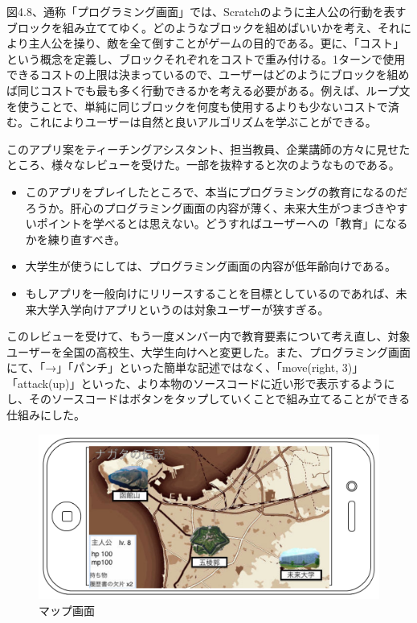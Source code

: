 \documentclass[openany,11pt,papersize]{jsbook}
\begin{document}
\par 図4.8、通称「プログラミング画面」では、Scratchのように主人公の行動を表すブロックを組み立ててゆく。どのようなブロックを組めばいいかを考え、それにより主人公を操り、敵を全て倒すことがゲームの目的である。更に、「コスト」という概念を定義し、ブロックそれぞれをコストで重み付ける。1ターンで使用できるコストの上限は決まっているので、ユーザーはどのようにブロックを組めば同じコストでも最も多く行動できるかを考える必要がある。例えば、ループ文を使うことで、単純に同じブロックを何度も使用するよりも少ないコストで済む。これによりユーザーは自然と良いアルゴリズムを学ぶことができる。
\par このアプリ案をティーチングアシスタント、担当教員、企業講師の方々に見せたところ、様々なレビューを受けた。一部を抜粋すると次のようなものである。
\begin{itemize}
 \item このアプリをプレイしたところで、本当にプログラミングの教育になるのだろうか。肝心のプログラミング画面の内容が薄く、未来大生がつまづきやすいポイントを学べるとは思えない。どうすればユーザーへの「教育」になるかを練り直すべき。
 \item 大学生が使うにしては、プログラミング画面の内容が低年齢向けである。
 \item もしアプリを一般向けにリリースすることを目標としているのであれば、未来大学入学向けアプリというのは対象ユーザーが狭すぎる。
 \end{itemize}
\par このレビューを受けて、もう一度メンバー内で教育要素について考え直し、対象ユーザーを全国の高校生、大学生向けへと変更した。また、プログラミング画面にて、「→」「パンチ」といった簡単な記述ではなく、「move(right, 3)」「attack(up)」といった、より本物のソースコードに近い形で表示するようにし、そのソースコードはボタンをタップしていくことで組み立てることができる仕組みにした。

\begin{figure}[H]
\begin{center}
\includegraphics[width=12cm, bb=0 0 1182 571]{img/LengedOfN_map.png}
\end{center}
\caption{マップ画面}
\end{figure}
\end{document}
